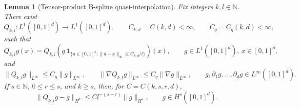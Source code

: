 \documentclass[11pt]{article}
\theoremstyle{plain}
\newtheorem{lemma}[theorem]{Lemma}
\theoremstyle{definition}
\theoremstyle{remark}
\begin{document}
\begin{lemma}[Tensor-product B-spline quasi-interpolation]
\label{lem:spline-stability}
Fix integers \(k,l\in\mathbb N\). There exist
\[
Q_{k,l}:L^1([0,1]^d)\to L^1([0,1]^d),
\qquad
C_{k,d}=C(k,d)<\infty,
\qquad
C_q=C_q(k,d)<\infty,
\]
such that
\[
Q_{k,l}g(x)
=
Q_{k,l}\!\left(
g\,\mathbf 1_{\{u\in[0,1]^d:\|u-x\|_\infty\le C_{k,d}/l\}}
\right)(x),
\qquad
g\in L^1([0,1]^d),\ x\in[0,1]^d,
\]
and
\begin{equation}
\label{eq:qi-Linfty-gradient-stability}
\|Q_{k,l}g\|_{L^\infty}
\le
C_q\|g\|_{L^\infty},
\qquad
\|\nabla Q_{k,l}g\|_{L^\infty}
\le
C_q\|\nabla g\|_{L^\infty},
\qquad
g,\partial_1g,\ldots,\partial_dg\in L^\infty([0,1]^d).
\end{equation}
If \(s\in\mathbb N\), \(0\le r\le s\), and \(k\ge s\), then, for
\(C=C(k,s,r,d)\),
\begin{equation}
\label{eq:bspline-Hr-approx-general}
\|Q_{k,l}g-g\|_{H^r}
\le
C l^{-(s-r)}
\|g\|_{H^s},
\qquad
g\in H^s([0,1]^d).
\end{equation}
\end{lemma}
\end{document}
